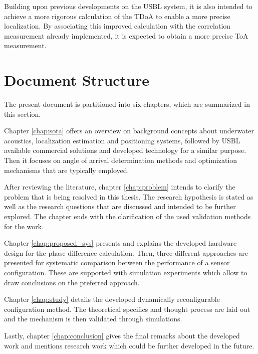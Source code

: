 Building upon previous developments on the USBL system, it is also intended to achieve a more rigorous calculation of the TDoA to enable a more precise localization. By associating this improved calculation with the correlation measurement already implemented, it is expected to obtain a more precise ToA measurement. 

\section{Document Structure}

The present document is partitioned into six chapters, which are summarized in this section.

Chapter \ref{chap:sota} offers an overview on background concepts about underwater acoustics, localization estimation and positioning systems, followed by USBL available commercial solutions and developed technology for a similar purpose. Then it focuses on angle of arrival determination methods and optimization mechanisms that are typically employed.

After reviewing the literature, chapter \ref{chap:problem} intends to clarify the problem that is being resolved in this thesis. The research hypothesis is stated as well as the research questions that are discussed and intended to be further explored. The chapter ends with the clarification of the used validation methods for the work. 

Chapter \ref{chap:proposed_sys} presents and explains the developed hardware design for the phase difference calculation. Then, three different approaches are presented for systematic comparison between the performance of a sensor configuration. These are supported with simulation experiments which allow to draw conclusions on the preferred approach.

Chapter \ref{chap:study} details the developed dynamically reconfigurable configuration method. The theoretical specifics and thought process are laid out and the mechanism is then validated through simulations.

Lastly, chapter \ref{chap:conclusion} gives the final remarks about the developed work and mentions research work which could be further developed in the future.  
